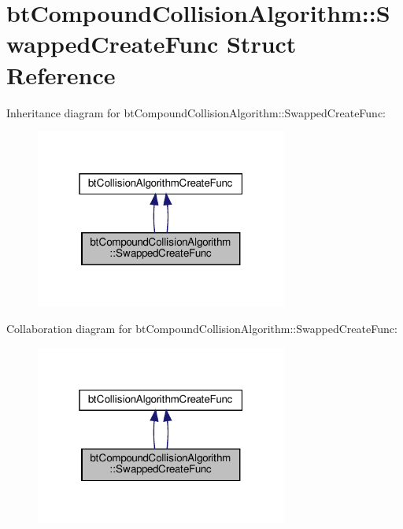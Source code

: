 \hypertarget{structbtCompoundCollisionAlgorithm_1_1SwappedCreateFunc}{}\section{bt\+Compound\+Collision\+Algorithm\+:\+:Swapped\+Create\+Func Struct Reference}
\label{structbtCompoundCollisionAlgorithm_1_1SwappedCreateFunc}


Inheritance diagram for bt\+Compound\+Collision\+Algorithm\+:\+:Swapped\+Create\+Func\+:
\nopagebreak
\begin{figure}[H]
\begin{center}
\leavevmode
\includegraphics[width=235pt]{structbtCompoundCollisionAlgorithm_1_1SwappedCreateFunc__inherit__graph}
\end{center}
\end{figure}


Collaboration diagram for bt\+Compound\+Collision\+Algorithm\+:\+:Swapped\+Create\+Func\+:
\nopagebreak
\begin{figure}[H]
\begin{center}
\leavevmode
\includegraphics[width=235pt]{structbtCompoundCollisionAlgorithm_1_1SwappedCreateFunc__coll__graph}
\end{center}
\end{figure}
